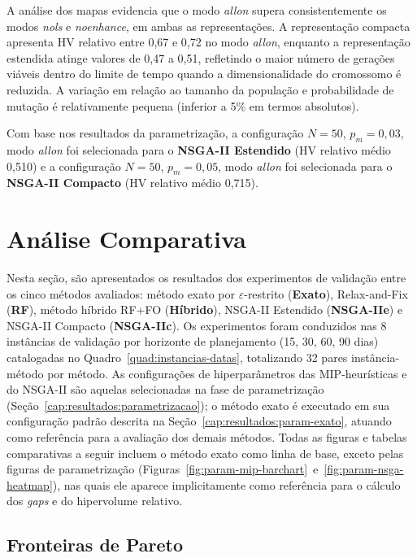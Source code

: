 A análise dos mapas evidencia que o modo \textit{allon} supera consistentemente os modos \textit{nols} e \textit{noenhance}, em ambas as representações. A representação compacta apresenta HV relativo entre 0{,}67 e 0{,}72 no modo \textit{allon}, enquanto a representação estendida atinge valores de 0{,}47 a 0{,}51, refletindo o maior número de gerações viáveis dentro do limite de tempo quando a dimensionalidade do cromossomo é reduzida. A variação em relação ao tamanho da população e probabilidade de mutação é relativamente pequena (inferior a 5\% em termos absolutos).

Com base nos resultados da parametrização, a configuração $N=50$, $p_m=0{,}03$, modo \textit{allon} foi selecionada para o \textbf{NSGA-II Estendido} (HV relativo médio 0{,}510) e a configuração $N=50$, $p_m=0{,}05$, modo \textit{allon} foi selecionada para o \textbf{NSGA-II Compacto} (HV relativo médio 0{,}715).

\section{Análise Comparativa}
\label{cap:resultados:comparacao}

Nesta seção, são apresentados os resultados dos experimentos de validação entre os cinco métodos avaliados: método exato por $\varepsilon$-restrito (\textbf{Exato}), Relax-and-Fix (\textbf{RF}), método híbrido RF+FO (\textbf{Híbrido}), NSGA-II Estendido (\textbf{NSGA-IIe}) e NSGA-II Compacto (\textbf{NSGA-IIc}). Os experimentos foram conduzidos nas 8 instâncias de validação por horizonte de planejamento (15, 30, 60, 90 dias) catalogadas no Quadro~\ref{quad:instancias-datas}, totalizando 32 pares instância-método por método. As configurações de hiperparâmetros das MIP-heurísticas e do NSGA-II são aquelas selecionadas na fase de parametrização (Seção~\ref{cap:resultados:parametrizacao}); o método exato é executado em sua configuração padrão descrita na Seção~\ref{cap:resultados:param-exato}, atuando como referência para a avaliação dos demais métodos. Todas as figuras e tabelas comparativas a seguir incluem o método exato como linha de base, exceto pelas figuras de parametrização (Figuras~\ref{fig:param-mip-barchart}~e~\ref{fig:param-nsga-heatmap}), nas quais ele aparece implicitamente como referência para o cálculo dos \textit{gaps} e do hipervolume relativo.

\subsection{Fronteiras de Pareto}
\label{cap:resultados:pareto}

